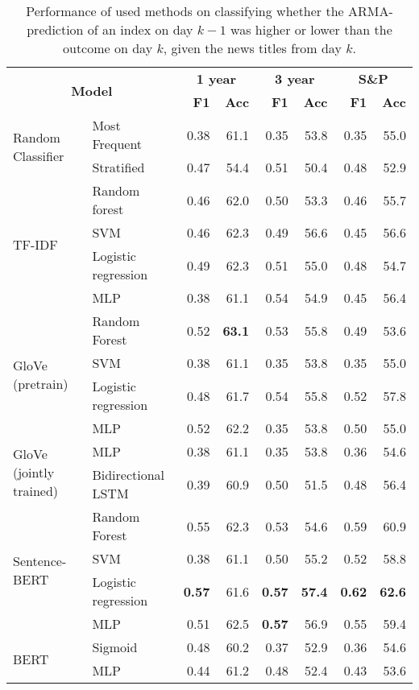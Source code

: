 \begin{table}[H]
    \centering
    \begin{tabular}{llrrrrrr}
    \hline
        \multicolumn{2}{c}{\multirow{2}{*}{\textbf{Model}}} & \multicolumn{2}{c}{\textbf{1 year}} & \multicolumn{2}{c}{\textbf{3 year}} & \multicolumn{2}{c}{\textbf{S\&P}} \\
      & & \textbf{F1} & \textbf{Acc} & \textbf{F1} & \textbf{Acc} & \textbf{F1} & \textbf{Acc} \\
        \hline \hline   
        \multirow{2}{*}{Random Classifier} & Most Frequent & 0.38 & 61.1 & 0.35 & 53.8 & 0.35 & 55.0  \\
        & Stratified & 0.47 & 54.4 & 0.51 & 50.4 & 0.48 & 52.9  \\
        \hline 
        \multirow{4}{*}{TF-IDF} & Random forest & 0.46 & 62.0 & 0.50 & 53.3 & 0.46 & 55.7  \\
        & SVM & 0.46 & 62.3 & 0.49 & 56.6 & 0.45 & 56.6 \\
        & Logistic regression & 0.49 & 62.3 & 0.51 & 55.0 & 0.48 & 54.7 \\
        & MLP & 0.38 & 61.1 &  0.54 & 54.9 & 0.45 & 56.4 \\
        \hline 
        \multirow{4}{*}{GloVe (pretrain)} & Random Forest & 0.52 & \textbf{63.1} & 0.53 & 55.8 & 0.49 & 53.6
        \\
        & SVM & 0.38 & 61.1 & 0.35 & 53.8 & 0.35 & 55.0 
        \\
        & Logistic regression & 0.48 & 61.7 & 0.54 & 55.8 & 0.52 & 57.8
        \\
        & MLP & 0.52 & 62.2 & 0.35 & 53.8 & 0.50 & 55.0 \\
        \hline 
        \multirow{2}{*}{GloVe (jointly trained)} & MLP & 0.38 & 61.1 & 0.35 & 53.8 & 0.36 & 54.6 \\
        & Bidirectional LSTM & 0.39 & 60.9 & 0.50 & 51.5 & 0.48 & 56.4 \\
        \hline 
        \multirow{4}{*}{Sentence-BERT} & Random Forest & 0.55 & 62.3 & 0.53 & 54.6 & 0.59 & 60.9 \\
        & SVM & 0.38 & 61.1 & 0.50 & 55.2 & 0.52 & 58.8 \\
        & Logistic regression & \textbf{0.57} & 61.6 & \textbf{0.57} & \textbf{57.4} & \textbf{0.62} & \textbf{62.6}   \\
        & MLP & 0.51 & 62.5 & \textbf{0.57} & 56.9 & 0.55 & 59.4 \\
        \hline
        \multirow{2}{*}{BERT} & Sigmoid & 0.48 & 60.2 & 0.37 & 52.9 & 0.36 & 54.6 \\
        & MLP & 0.44 & 61.2 & 0.48 & 52.4 & 0.43 & 53.6 \\
        \hline
    \end{tabular}
\caption{Performance of used methods on classifying whether the ARMA-prediction of an index on day $k-1$ was higher or lower than the outcome on day $k$, given the news titles from day $k$.}
\label{tab:res_arma_cdp}
\end{table}

